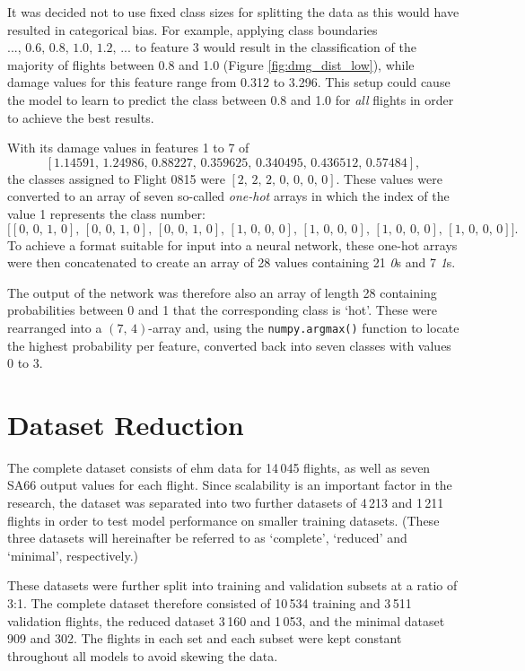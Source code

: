 It was decided not to use fixed class sizes for splitting the data as this would have resulted in categorical bias. For example, applying class boundaries \(...,\,0.6,\,0.8,\,1.0,\,1.2,\,...\) to feature 3 would result in the classification of the majority of flights between 0.8 and 1.0 (Figure \ref{fig:dmg_dist_low}), while damage values for this feature range from 0.312 to 3.296. This setup could cause the model to learn to predict the class between 0.8 and 1.0 for \textit{all} flights in order to achieve the best results.

With its damage values in features 1 to 7 of
\[
    \left[1.14591,\,1.24986,\,0.88227,\,0.359625,\,0.340495,\,0.436512,\,0.57484\right],
\]
the classes assigned to Flight 0815 were \(\left[2,\,2,\,2,\,0,\,0,\,0,\,0\right]\). These values were converted to an array of seven so-called \textit{one-hot} arrays in which the index of the value 1 represents the class number:
\[
    \big[ \left[ 0,\,0,\,1,\,0 \right],\,\left[ 0,\,0,\,1,\,0 \right],\,\left[ 0,\,0,\,1,\,0 \right],\,\left[ 1,\,0,\,0,\,0 \right],\,\left[ 1,\,0,\,0,\,0 \right],\,\left[ 1,\,0,\,0,\,0 \right],\,\left[ 1,\,0,\,0,\,0 \right]\big].
\]
To achieve a format suitable for input into a neural network, these one-hot arrays were then concatenated to create an array of 28 values containing 21 \textit{0}s and 7 \textit{1}s.

The output of the network was therefore also an array of length 28 containing probabilities between 0 and 1 that the corresponding class is `hot'. These were rearranged into a \mbox{\(\left(7,\,4\right)\)-array} and, using the \texttt{numpy.argmax()} function to locate the highest probability per feature, converted back into seven classes with values 0 to 3.

\section{Dataset Reduction} \label{sec:data_sizes}
The complete dataset consists of \ac{ehm} data for 14\,045 flights, as well as seven SA66 output values for each flight. Since scalability is an important factor in the research, the dataset was separated into two further datasets of 4\,213 and 1\,211 flights in order to test model performance on smaller training datasets. (These three datasets will hereinafter be referred to as `complete', `reduced' and `minimal', respectively.)

These datasets were further split into training and validation subsets at a ratio of 3:1. The complete dataset therefore consisted of 10\,534 training and 3\,511 validation flights, the reduced dataset 3\,160 and 1\,053, and the minimal dataset 909 and 302. The flights in each set and each subset were kept constant throughout all models to avoid skewing the data.



